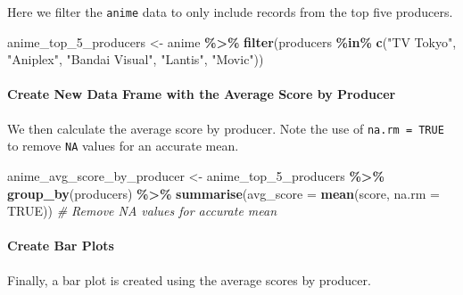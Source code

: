 \documentclass[
]{book}
\newenvironment{Shaded}{\begin{snugshade}}{\end{snugshade}}
\newcommand{\AttributeTok}[1]{\textcolor[rgb]{0.13,0.29,0.53}{#1}}
\newcommand{\CommentTok}[1]{\textcolor[rgb]{0.56,0.35,0.01}{\textit{#1}}}
\newcommand{\ConstantTok}[1]{\textcolor[rgb]{0.56,0.35,0.01}{#1}}
\newcommand{\FunctionTok}[1]{\textcolor[rgb]{0.13,0.29,0.53}{\textbf{#1}}}
\newcommand{\NormalTok}[1]{#1}
\newcommand{\OtherTok}[1]{\textcolor[rgb]{0.56,0.35,0.01}{#1}}
\newcommand{\SpecialCharTok}[1]{\textcolor[rgb]{0.81,0.36,0.00}{\textbf{#1}}}
\newcommand{\StringTok}[1]{\textcolor[rgb]{0.31,0.60,0.02}{#1}}
\begin{document}
Here we filter the \texttt{anime} data to only include records from the top five producers.

\begin{Shaded}
\begin{Highlighting}[]
\NormalTok{anime\_top\_5\_producers }\OtherTok{\textless{}{-}}\NormalTok{ anime }\SpecialCharTok{\%\textgreater{}\%}
  \FunctionTok{filter}\NormalTok{(producers }\SpecialCharTok{\%in\%} \FunctionTok{c}\NormalTok{(}\StringTok{"TV Tokyo"}\NormalTok{, }\StringTok{"Aniplex"}\NormalTok{, }\StringTok{"Bandai Visual"}\NormalTok{, }\StringTok{"Lantis"}\NormalTok{, }\StringTok{"Movic"}\NormalTok{))}
\end{Highlighting}
\end{Shaded}

\paragraph*{Create New Data Frame with the Average Score by Producer}\label{create-new-data-frame-with-the-average-score-by-producer}

We then calculate the average score by producer. Note the use of \texttt{na.rm\ =\ TRUE} to remove \texttt{NA} values for an accurate mean.

\begin{Shaded}
\begin{Highlighting}[]
\NormalTok{anime\_avg\_score\_by\_producer }\OtherTok{\textless{}{-}}\NormalTok{ anime\_top\_5\_producers }\SpecialCharTok{\%\textgreater{}\%}
  \FunctionTok{group\_by}\NormalTok{(producers) }\SpecialCharTok{\%\textgreater{}\%}
  \FunctionTok{summarise}\NormalTok{(}\AttributeTok{avg\_score =} \FunctionTok{mean}\NormalTok{(score, }\AttributeTok{na.rm =} \ConstantTok{TRUE}\NormalTok{))  }\CommentTok{\# Remove NA values for accurate mean}
\end{Highlighting}
\end{Shaded}

\paragraph*{Create Bar Plots}\label{create-bar-plots}

Finally, a bar plot is created using the average scores by producer.
\end{document}
